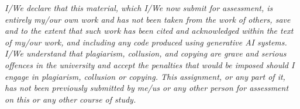 \documentclass{article}  %
\begin{document}
\textit{I/We declare that this material, which I/We now submit for assessment, is entirely my/our own work and has not been taken from the work of others, save and to the extent that such work has been cited and acknowledged within the text of my/our work, and including any code produced using generative AI systems. I/We understand that plagiarism, collusion, and copying are grave and serious offences in the university and accept the penalties that would be imposed should I engage in plagiarism, collusion or copying. This assignment, or any part of it, has not been previously submitted by me/us or any other person for assessment on this or any other course of study.}
\clearpage
\nocite{*}
\printbibliography
\end{document}
